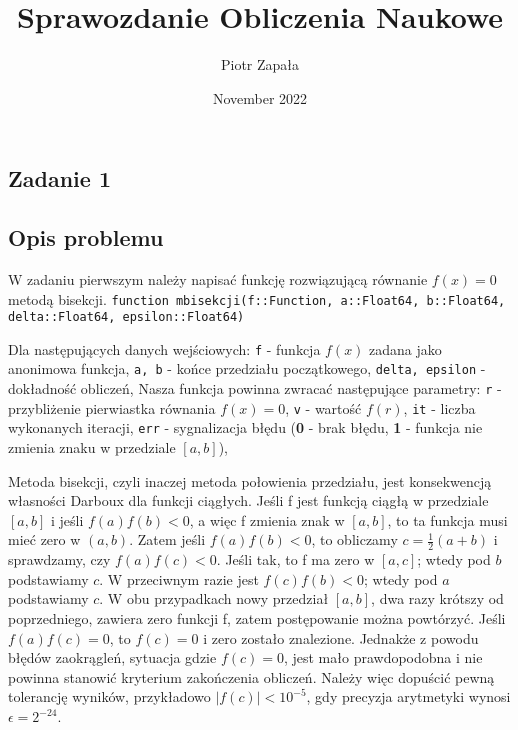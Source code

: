 \documentclass{article}
\title{Sprawozdanie Obliczenia Naukowe}
\author{Piotr Zapała}
\date{November 2022}
\begin{document}
\maketitle

\tableofcontents
\newpage
\begin{center}
    \section{Zadanie 1}
    \subsection{Opis problemu}
    \large W zadaniu pierwszym należy napisać funkcję rozwiązującą równanie \(f(x) = 0\) metodą bisekcji. \newline
     \texttt{function mbisekcji(f::Function, a::Float64, b::Float64, delta::Float64, epsilon::Float64)} 
     \begin{flushleft}
        Dla następujących danych wejściowych: \newline
        \texttt{f} - funkcja \(f(x)\) zadana jako anonimowa funkcja, \newline
        \texttt{a, b} - końce przedziału początkowego, \newline
        \texttt{delta, epsilon} - dokładność obliczeń, \newline
        \newline
        Nasza funkcja powinna zwracać następujące parametry: \newline
        \texttt{r} - przybliżenie pierwiastka równania \(f(x) = 0\), \newline
        \texttt{v} - wartość \(f(r)\), \newline
        \texttt{it} - liczba wykonanych iteracji, \newline
        \texttt{err} - sygnalizacja błędu (\textbf{0} - brak błędu, \textbf{1} - funkcja nie zmienia znaku w przedziale \([a, b]\)), \newline
     \end{flushleft}
     Metoda bisekcji, czyli inaczej metoda połowienia przedziału, jest konsekwencją własności Darboux dla funkcji ciągłych.
     Jeśli f jest funkcją ciągłą w przedziale \([a, b]\) i jeśli \(f(a)f(b) < 0\), a więc f zmienia znak w \([a, b]\),
     to ta funkcja musi mieć zero w \((a, b)\). Zatem jeśli \(f(a)f(b) < 0\), to obliczamy \(c = \frac{1}{2}(a + b)\)
     i sprawdzamy, czy \(f(a)f(c) < 0\). Jeśli tak, to f ma zero w \([a, c]\); wtedy pod \(b\) podstawiamy \(c\).
     W przeciwnym razie jest \(f(c)f(b) < 0\); wtedy pod \(a\) podstawiamy \(c\). W obu przypadkach nowy przedział \([a, b]\), 
     dwa razy krótszy od poprzedniego, zawiera zero funkcji f, zatem postępowanie można powtórzyć. Jeśli \(f(a)f(c) = 0\), to \(f(c) = 0\) i zero zostało znalezione.
     Jednakże z powodu błędów zaokrągleń, sytuacja gdzie \(f(c) = 0\), jest mało prawdopodobna i nie powinna stanowić kryterium zakończenia obliczeń.
     Należy więc dopuścić pewną tolerancję wyników, przykładowo \(|f(c)| < 10^{-5}\), gdy precyzja arytmetyki wynosi \(\epsilon = 2^{-24}\).


\end{center}
\end{document}
